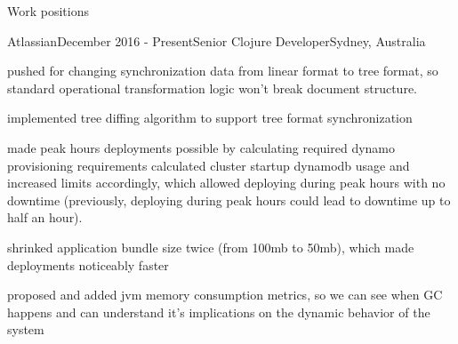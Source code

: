 \documentclass{resume} %
\begin{document}

\begin{rSection}{Work positions}

\begin{rSubsection}{Atlassian}{December 2016 - Present}{Senior Clojure Developer}{Sydney, Australia}

\item pushed for changing synchronization data from linear format to tree format, so standard operational
  transformation logic won't break document structure.

\item implemented tree diffing algorithm to support tree format synchronization

\item made peak hours deployments possible by calculating required dynamo provisioning
  requirements calculated cluster startup dynamodb usage and increased
    limits accordingly, which allowed deploying during peak hours
    with no downtime (previously, deploying during peak hours could
    lead to downtime up to half an hour).
\item shrinked application bundle size twice (from 100mb to 50mb), which made deployments noticeably faster
\item proposed and added jvm memory consumption metrics, so we can see when GC happens and can understand it's implications on the dynamic behavior of the system



\end{rSubsection}
\end{rSection}
\end{document}
